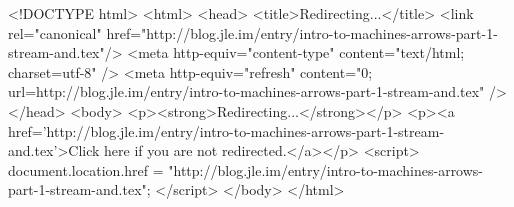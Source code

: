 <!DOCTYPE html>
<html>
<head>
<title>Redirecting...</title>
<link rel="canonical" href="http://blog.jle.im/entry/intro-to-machines-arrows-part-1-stream-and.tex"/>
<meta http-equiv="content-type" content="text/html; charset=utf-8" />
<meta http-equiv="refresh" content="0; url=http://blog.jle.im/entry/intro-to-machines-arrows-part-1-stream-and.tex" />
</head>
<body>
  <p><strong>Redirecting...</strong></p>
  <p><a href='http://blog.jle.im/entry/intro-to-machines-arrows-part-1-stream-and.tex'>Click here if you are not redirected.</a></p>
  <script>
    document.location.href = "http://blog.jle.im/entry/intro-to-machines-arrows-part-1-stream-and.tex";
  </script>
</body>
</html>
